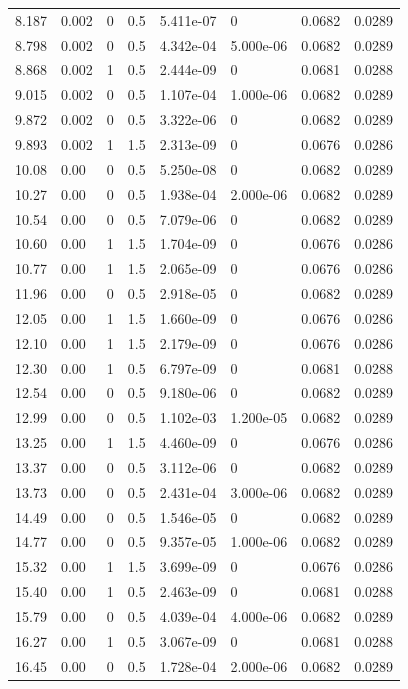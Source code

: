 \documentclass[preview]{standalone}
\begin{document}
{{\begin{tabular}{L{1.2cm}C{1.2cm} C{0.3cm}C{0.5cm} C{1.4cm}C{1.4cm} C{1.4cm}C{1.4cm}}
  8.187  &  0.002  & 0     & 0.5 &  5.411e-07  & 0  & 0.0682 &  0.0289   \\ 
  8.798  &  0.002  & 0     & 0.5 &  4.342e-04  & 5.000e-06  & 0.0682 &  0.0289   \\ 
  8.868  &  0.002  & 1     & 0.5 &  2.444e-09  & 0  & 0.0681 &  0.0288   \\ 
  9.015  &  0.002  & 0     & 0.5 &  1.107e-04  & 1.000e-06  & 0.0682 &  0.0289   \\ 
  9.872  &  0.002  & 0     & 0.5 &  3.322e-06  & 0  & 0.0682 &  0.0289   \\ 
  9.893  &  0.002  & 1     & 1.5 &  2.313e-09  & 0  & 0.0676 &  0.0286   \\ 
  10.08  &  0.00  & 0     & 0.5 &  5.250e-08  & 0  & 0.0682 &  0.0289   \\ 
  10.27  &  0.00  & 0     & 0.5 &  1.938e-04  & 2.000e-06  & 0.0682 &  0.0289   \\ 
  10.54  &  0.00  & 0     & 0.5 &  7.079e-06  & 0  & 0.0682 &  0.0289   \\ 
  10.60  &  0.00  & 1     & 1.5 &  1.704e-09  & 0  & 0.0676 &  0.0286   \\ 
  10.77  &  0.00  & 1     & 1.5 &  2.065e-09  & 0  & 0.0676 &  0.0286   \\ 
  11.96  &  0.00  & 0     & 0.5 &  2.918e-05  & 0  & 0.0682 &  0.0289   \\ 
  12.05  &  0.00  & 1     & 1.5 &  1.660e-09  & 0  & 0.0676 &  0.0286   \\ 
  12.10  &  0.00  & 1     & 1.5 &  2.179e-09  & 0  & 0.0676 &  0.0286   \\ 
  12.30  &  0.00  & 1     & 0.5 &  6.797e-09  & 0  & 0.0681 &  0.0288   \\ 
  12.54  &  0.00  & 0     & 0.5 &  9.180e-06  & 0  & 0.0682 &  0.0289   \\ 
  12.99  &  0.00  & 0     & 0.5 &  1.102e-03  & 1.200e-05  & 0.0682 &  0.0289   \\ 
  13.25  &  0.00  & 1     & 1.5 &  4.460e-09  & 0  & 0.0676 &  0.0286   \\ 
  13.37  &  0.00  & 0     & 0.5 &  3.112e-06  & 0  & 0.0682 &  0.0289   \\ 
  13.73  &  0.00  & 0     & 0.5 &  2.431e-04  & 3.000e-06  & 0.0682 &  0.0289   \\ 
  14.49  &  0.00  & 0     & 0.5 &  1.546e-05  & 0  & 0.0682 &  0.0289   \\ 
  14.77  &  0.00  & 0     & 0.5 &  9.357e-05  & 1.000e-06  & 0.0682 &  0.0289   \\ 
  15.32  &  0.00  & 1     & 1.5 &  3.699e-09  & 0  & 0.0676 &  0.0286   \\ 
  15.40  &  0.00  & 1     & 0.5 &  2.463e-09  & 0  & 0.0681 &  0.0288   \\ 
  15.79  &  0.00  & 0     & 0.5 &  4.039e-04  & 4.000e-06  & 0.0682 &  0.0289   \\ 
  16.27  &  0.00  & 1     & 0.5 &  3.067e-09  & 0  & 0.0681 &  0.0288   \\ 
  16.45  &  0.00  & 0     & 0.5 &  1.728e-04  & 2.000e-06  & 0.0682 &  0.0289   \\ 
\hline 
\end{tabular} 

}}
\end{document}
